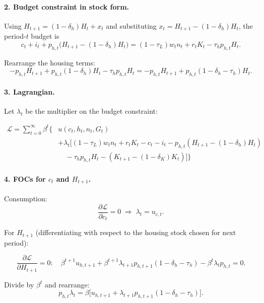 \paragraph{2. Budget constraint in stock form.}
Using $H_{t+1}=(1-\delta_h)H_t + x_t$ and substituting $x_t=H_{t+1}-(1-\delta_h)H_t$, the period-$t$ budget is
\[
c_t + i_t + p_{h,t}\bigl(H_{t+1}-(1-\delta_h)H_t\bigr)
= (1-\tau_L)w_t n_t + r_t K_t - \tau_h p_{h,t} H_t.
\]

Rearrange the housing terms:
\[
- p_{h,t}H_{t+1} + p_{h,t}(1-\delta_h)H_t - \tau_h p_{h,t} H_t
= - p_{h,t}H_{t+1} + p_{h,t}(1-\delta_h-\tau_h)H_t.
\]

\paragraph{3. Lagrangian.}
Let $\lambda_t$ be the multiplier on the budget constraint:

\begin{align}
\mathcal{L} = \sum_{t=0}^{\infty}\beta^t \Big\{ &
u(c_t,h_t,n_t,G_t) \nonumber \\
&+ \lambda_t \big[ (1-\tau_L)w_t n_t + r_t K_t
- c_t - i_t
- p_{h,t}(H_{t+1}-(1-\delta_h)H_t) \nonumber \\
&\quad - \tau_h p_{h,t}H_t
- (K_{t+1}-(1-\delta_K)K_t) \big] \Big\}
\end{align}

\paragraph{4. FOCs for $c_t$ and $H_{t+1}$.}
Consumption:
\[
\frac{\partial \mathcal{L}}{\partial c_t}=0
\;\Rightarrow\;
\lambda_t = u_{c,t}.
\]

For $H_{t+1}$ (differentiating with respect to the housing stock chosen for next period):

\[
\frac{\partial \mathcal{L}}{\partial H_{t+1}}=0:
\quad
\beta^{t+1} u_{h,t+1}
+\beta^{t+1} \lambda_{t+1} p_{h,t+1}(1-\delta_h-\tau_h)
-\beta^{t}\lambda_{t} p_{h,t}=0.
\]

Divide by $\beta^{t}$ and rearrange:
\[
p_{h,t}\lambda_{t}
=
\beta\big[u_{h,t+1} + \lambda_{t+1} p_{h,t+1}(1-\delta_h-\tau_h)\big].
\]


